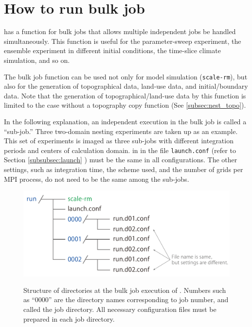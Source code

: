 \section{How to run bulk job} \label{sec:bulkjob}

 \scalerm has a function for bulk jobs that allows multiple independent jobs be handled simultaneously. This function is useful for the parameter-sweep experiment, the ensemble experiment in different initial conditions, the time-slice climate simulation, and so on.

The bulk job function can be used not only for model simulation (\verb|scale-rm|), but also for the generation of topographical data, land-use data, and initial/boundary data. Note that the generation of topographical/land-use data by this function is limited to the case without a topography copy function (See \ref{subsec:nest_topo}).

In the following explanation, an independent execution in the bulk job is called a ``sub-job.'' Three two-domain nesting experiments are taken up as an example. This set of experiments is imaged as three sub-jobs with different integration periods and centers of calculation domain.  in  in the file \verb|launch.conf| (refer to Section \ref{subsubsec:launch} ) must be the same in all configurations. The other settings, such as integration time, the scheme used, and the number of grids per MPI process, do not need to be the same among the sub-jobs.

\begin{figure}[t]
\begin{center}
  \includegraphics[width=0.6\hsize]{./figure/bulkjob_directory_structure.eps}\\
  \caption{Structure of directories at the bulk job execution of \scalerm.
Numbers such as ``0000'' are the directory names corresponding to job number, and called the job directory.   All necessary configuration files must be prepared in each job directory.
}
  \label{fig_bulkjob}
\end{center}
\end{figure}

